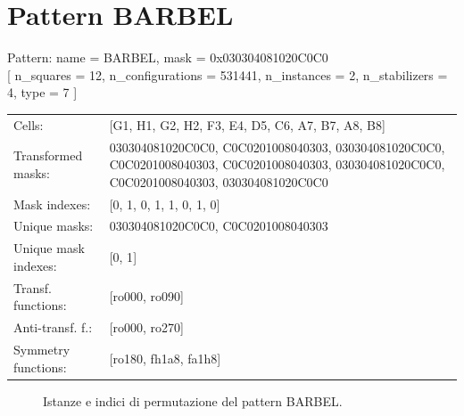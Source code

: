 \newpage

\section{Pattern BARBEL}

\begin{tcolorbox}[sharp corners, fontupper=\ttfamily\small, colback=white]
  \noindent Pattern: name = BARBEL, mask = 0x030304081020C0C0\\
  {[} n\_squares = 12, n\_configurations = 531441,
  n\_instances = 2, n\_stabilizers = 4, type = 7 { ]}\\[1.0ex]
  \begin{tabularx}{\textwidth}{@{} p{3.5cm} X @{}}
    Cells:               & {[}G1, H1, G2, H2, F3, E4, D5, C6, A7, B7, A8, B8{]}\\[0.5ex]
    Transformed masks:   & 030304081020C0C0, C0C0201008040303, 030304081020C0C0, C0C0201008040303, C0C0201008040303, 030304081020C0C0, C0C0201008040303, 030304081020C0C0\\[0.5ex]
    Mask indexes:        & {[}0, 1, 0, 1, 1, 0, 1, 0{]}\\[0.5ex]
    Unique masks:        & 030304081020C0C0, C0C0201008040303\\[0.5ex]
    Unique mask indexes: & {[}0, 1{]}\\[0.5ex]
    Transf. functions:   & {[}ro000, ro090{]}\\[0.5ex]
    Anti-transf. f.:     & {[}ro000, ro270{]}\\[0.5ex]
    Symmetry functions:  & {[}ro180, fh1a8, fa1h8{]}\\[0.5ex]
  \end{tabularx}
\end{tcolorbox}

\begin{figure}[htbp]
  \centering
   \hfill
   \hfill
   \hfill
  \vspace{0.3cm}
   \hfill
   \hfill
   \hfill
  \caption{Istanze e indici di permutazione del pattern BARBEL.}
\end{figure}

